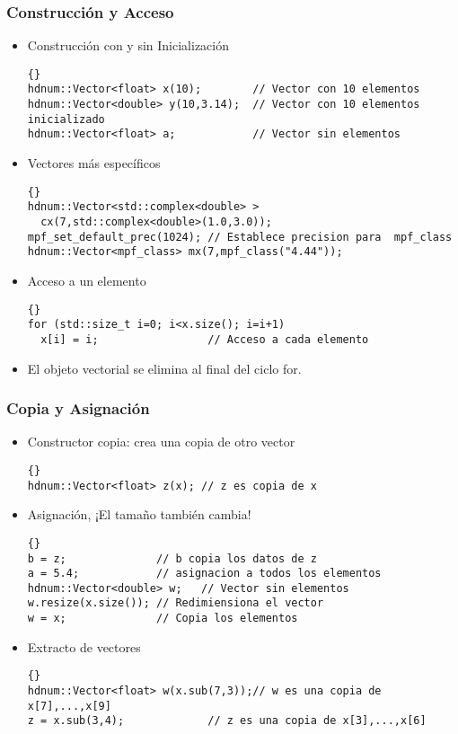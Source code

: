 \begin{frame}[fragile]
\frametitle{Construcción y Acceso}
\begin{itemize}
\item Construcción con y sin Inicialización\\
{\footnotesize{\begin{lstlisting}{}
hdnum::Vector<float> x(10);        // Vector con 10 elementos
hdnum::Vector<double> y(10,3.14);  // Vector con 10 elementos inicializado
hdnum::Vector<float> a;            // Vector sin elementos
\end{lstlisting}}}
\item Vectores más específicos\\
{\footnotesize{\begin{lstlisting}{}
hdnum::Vector<std::complex<double> >
  cx(7,std::complex<double>(1.0,3.0));
mpf_set_default_prec(1024); // Establece precision para  mpf_class
hdnum::Vector<mpf_class> mx(7,mpf_class("4.44"));
\end{lstlisting}}}
\item Acceso a un elemento\\
{\footnotesize{\begin{lstlisting}{}
for (std::size_t i=0; i<x.size(); i=i+1)
  x[i] = i;                 // Acceso a cada elemento
\end{lstlisting}}}
\item El objeto vectorial se elimina al final del ciclo for.
\end{itemize}
\end{frame}

\begin{frame}[fragile]
\frametitle{Copia y Asignación}
\begin{itemize}
\item Constructor copia: crea una copia de otro vector
{\footnotesize{\begin{lstlisting}{}
hdnum::Vector<float> z(x); // z es copia de x
\end{lstlisting}}}
\item Asignación, ¡El tamaño también cambia!
{\footnotesize{\begin{lstlisting}{}
b = z;              // b copia los datos de z 
a = 5.4;            // asignacion a todos los elementos
hdnum::Vector<double> w;   // Vector sin elementos
w.resize(x.size()); // Redimiensiona el vector 
w = x;              // Copia los elementos
\end{lstlisting}}}
\item Extracto de vectores\\
{\footnotesize{\begin{lstlisting}{}
hdnum::Vector<float> w(x.sub(7,3));// w es una copia de x[7],...,x[9]
z = x.sub(3,4);             // z es una copia de x[3],...,x[6]
\end{lstlisting}}}
\end{itemize}
\end{frame}

